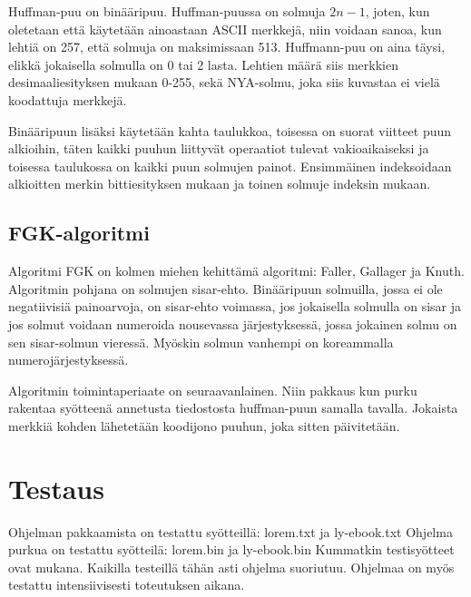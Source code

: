\documentclass[11pt,a4paper,draft]{article}
\begin{document}
			Huffman-puu on binääripuu. Huffman-puussa on solmuja \( 2n-1 \), joten, kun oletetaan 
			että käytetään ainoastaan ASCII merkkejä, niin voidaan sanoa, kun lehtiä on 257, 
			että solmuja on maksimissaan 513. Huffmann-puu on aina täysi, 
			elikkä jokaisella solmulla on 0 tai 2 lasta. Lehtien määrä siis merkkien desimaaliesityksen 
			mukaan 0-255, sekä NYA-solmu, joka siis kuvastaa ei vielä koodattuja merkkejä.
			
			Binääripuun lisäksi käytetään kahta taulukkoa, toisessa on suorat viitteet puun alkioihin, täten kaikki 
			puuhun liittyvät operaatiot tulevat vakioaikaiseksi ja toisessa taulukossa on kaikki puun solmujen painot. 
			Ensimmäinen indeksoidaan alkioitten merkin bittiesityksen mukaan ja toinen solmuje indeksin mukaan. 
			
		
		\subsection{FGK-algoritmi} %
		\label{sub:fgk_algoritmi}
			
			Algoritmi FGK on kolmen miehen kehittämä algoritmi: Faller, Gallager ja Knuth. Algoritmin pohjana on solmujen sisar-ehto.
			Binääripuun solmuilla, jossa ei ole negatiivisiä painoarvoja, on sisar-ehto voimassa, jos jokaisella solmulla on sisar 
			ja jos solmut voidaan numeroida nousevassa järjestyksessä, jossa jokainen solmu on sen sisar-solmun vieressä. 
			Myöskin solmun vanhempi on koreammalla numerojärjestyksessä.
			
			Algoritmin toimintaperiaate on seuraavanlainen. Niin pakkaus kun purku rakentaa syötteenä annetusta tiedostosta huffman-puun samalla tavalla.
			Jokaista merkkiä kohden lähetetään koodijono puuhun, joka sitten päivitetään.
		
	
	
	\section{Testaus} %
	\label{sec:testaus}
	
		Ohjelman pakkaamista on testattu syötteillä: lorem.txt ja ly-ebook.txt
		Ohjelma purkua on testattu syötteilä: lorem.bin ja ly-ebook.bin
		Kummatkin testisyötteet ovat mukana. Kaikilla testeillä tähän asti ohjelma suoriutuu. 
		Ohjelmaa on myös testattu intensiivisesti toteutuksen aikana.
	
\end{document}
